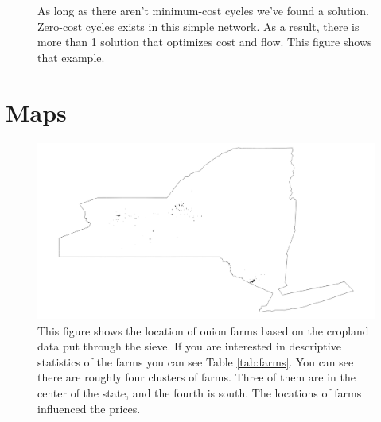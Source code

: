 \documentclass{report}
\begin{document}
\begin{figure}[!htb]
\centering
\begin{framed}
\caption{As long as there aren't minimum-cost cycles we've found a solution. Zero-cost cycles exists in this simple network. As a result, there is more than 1 solution that optimizes cost and flow. This figure shows that example.}
\label{fig:example6}
\end{framed}
\end{figure}

\section{Maps}



\begin{figure}
\centering
\begin{framed}
\includegraphics[scale=.50]{farms_49}
\caption{This figure shows the location of onion farms based on the cropland data put through the sieve. If you are interested in descriptive statistics of the farms you can see Table \ref{tab:farms}. You can see there are roughly four clusters of farms. Three of them are in the center of the state, and the fourth is south. The locations of farms influenced the prices.}
\label{fig:farms_49}
\end{framed}
\end{figure}
\end{document}
